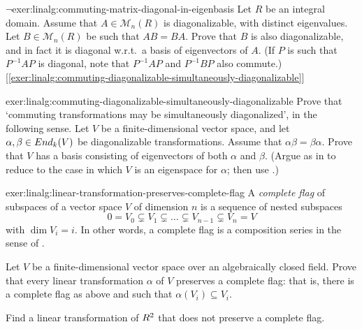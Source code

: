 \begin{exer}{$\lnot$}{exer:linalg:commuting-matrix-diagonal-in-eigenbasis}
  Let $R$ be an integral domain. Assume that $A \in \mathcal{M}_n(R)$
  is diagonalizable, with distinct eigenvalues. Let
  $B \in \mathcal{M}_n(R)$ be such that $AB = BA$. Prove that $B$ is
  also diagonalizable, and in fact it is diagonal w.r.t.\ a basis of
  eigenvectors of $A$. (If $P$ is such that $P^{-1}AP$ is diagonal,
  note that $P^{-1}AP$ and $P^{-1}BP$ also commute.)
  [\ref{exer:linalg:commuting-diagonalizable-simultaneously-diagonalizable}]
\end{exer}
\begin{exer}{}{exer:linalg:commuting-diagonalizable-simultaneously-diagonalizable}
  Prove that `commuting transformations may be simultaneously
  diagonalized', in the following sense. Let $V$ be a
  finite-dimensional vector space, and let
  $\alpha, \beta \in End_k(V)$ be diagonalizable
  transformations. Assume that $\alpha\beta = \beta\alpha$.  Prove
  that $V$ has a basis consisting of eigenvectors of both $\alpha$ and
  $\beta$. (Argue as in
  to reduce to the case in which $V$ is an eigenspace for $\alpha$;
  then use
  .)
\end{exer}
\begin{exer}{}{exer:linalg:linear-transformation-preserves-complete-flag}
  A \emph{complete flag} of subspaces of a vector space $V$ of
  dimension $n$ is a sequence of nested subspaces
  \[
    0 = V_0 \subsetneq V_1 \subsetneq \dots \subsetneq V_{n-1}
    \subsetneq V_n = V
  \]
  with $\dim V_i = i$. In other words, a complete flag is a
  composition series in the sense of
  .

  Let $V$ be a finite-dimensional vector space over an algebraically
  closed field. Prove that every linear transformation $\alpha$ of $V$
  preserves a complete flag: that is, there is a complete flag as
  above and such that $\alpha(V_i) \subseteq V_i$.

  Find a linear transformation of $R^2$ that does not preserve a
  complete flag.
\end{exer}
